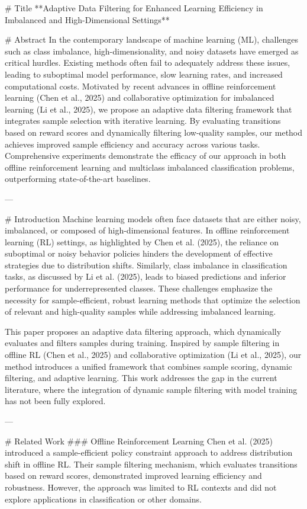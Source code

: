 # Title  
**Adaptive Data Filtering for Enhanced Learning Efficiency in Imbalanced and High-Dimensional Settings**  

# Abstract  
In the contemporary landscape of machine learning (ML), challenges such as class imbalance, high-dimensionality, and noisy datasets have emerged as critical hurdles. Existing methods often fail to adequately address these issues, leading to suboptimal model performance, slow learning rates, and increased computational costs. Motivated by recent advances in offline reinforcement learning (Chen et al., 2025) and collaborative optimization for imbalanced learning (Li et al., 2025), we propose an adaptive data filtering framework that integrates sample selection with iterative learning. By evaluating transitions based on reward scores and dynamically filtering low-quality samples, our method achieves improved sample efficiency and accuracy across various tasks. Comprehensive experiments demonstrate the efficacy of our approach in both offline reinforcement learning and multiclass imbalanced classification problems, outperforming state-of-the-art baselines.  

---

# Introduction  
Machine learning models often face datasets that are either noisy, imbalanced, or composed of high-dimensional features. In offline reinforcement learning (RL) settings, as highlighted by Chen et al. (2025), the reliance on suboptimal or noisy behavior policies hinders the development of effective strategies due to distribution shifts. Similarly, class imbalance in classification tasks, as discussed by Li et al. (2025), leads to biased predictions and inferior performance for underrepresented classes. These challenges emphasize the necessity for sample-efficient, robust learning methods that optimize the selection of relevant and high-quality samples while addressing imbalanced learning.

This paper proposes an adaptive data filtering approach, which dynamically evaluates and filters samples during training. Inspired by sample filtering in offline RL (Chen et al., 2025) and collaborative optimization (Li et al., 2025), our method introduces a unified framework that combines sample scoring, dynamic filtering, and adaptive learning. This work addresses the gap in the current literature, where the integration of dynamic sample filtering with model training has not been fully explored.  

---

# Related Work  
### Offline Reinforcement Learning  
Chen et al. (2025) introduced a sample-efficient policy constraint approach to address distribution shift in offline RL. Their sample filtering mechanism, which evaluates transitions based on reward scores, demonstrated improved learning efficiency and robustness. However, the approach was limited to RL contexts and did not explore applications in classification or other domains.  


